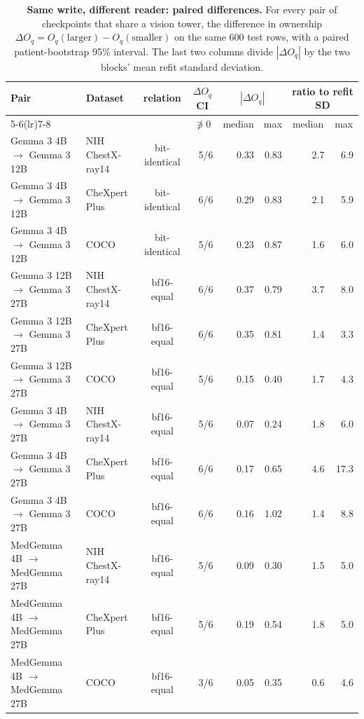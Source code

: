 \begin{table}[h]
\centering
\scriptsize
\setlength{\tabcolsep}{4pt}
\caption{\textbf{Same write, different reader: paired differences.} For every pair of checkpoints that share a vision tower, the difference in ownership $\Delta O_q=O_q(\text{larger})-O_q(\text{smaller})$ on the same 600 test rows, with a paired patient-bootstrap 95\% interval. The last two columns divide $|\Delta O_q|$ by the two blocks' mean refit standard deviation.}
\label{tab:cf-pairs}
\begin{tabular}{llcrrrrr}
\toprule
\multirow{2}{*}{Pair} & \multirow{2}{*}{Dataset} & \multirow{2}{*}{relation} & \multicolumn{1}{c}{$\Delta O_q$ CI} & \multicolumn{2}{c}{$|\Delta O_q|$} & \multicolumn{2}{c}{ratio to refit SD}\\
\cmidrule(lr){5-6}\cmidrule(lr){7-8}
&  &  & \multicolumn{1}{c}{$\not\ni 0$} & \multicolumn{1}{c}{median} & \multicolumn{1}{c}{max} & \multicolumn{1}{c}{median} & \multicolumn{1}{c}{max}\\
\midrule
Gemma 3 4B $\to$ Gemma 3 12B & NIH ChestX-ray14 & bit-identical & 5/6 & 0.33 & 0.83 & 2.7 & 6.9 \\
Gemma 3 4B $\to$ Gemma 3 12B & CheXpert Plus & bit-identical & 6/6 & 0.29 & 0.83 & 2.1 & 5.9 \\
Gemma 3 4B $\to$ Gemma 3 12B & COCO & bit-identical & 5/6 & 0.23 & 0.87 & 1.6 & 6.0 \\
Gemma 3 12B $\to$ Gemma 3 27B & NIH ChestX-ray14 & bf16-equal & 6/6 & 0.37 & 0.79 & 3.7 & 8.0 \\
Gemma 3 12B $\to$ Gemma 3 27B & CheXpert Plus & bf16-equal & 6/6 & 0.35 & 0.81 & 1.4 & 3.3 \\
Gemma 3 12B $\to$ Gemma 3 27B & COCO & bf16-equal & 5/6 & 0.15 & 0.40 & 1.7 & 4.3 \\
Gemma 3 4B $\to$ Gemma 3 27B & NIH ChestX-ray14 & bf16-equal & 5/6 & 0.07 & 0.24 & 1.8 & 6.0 \\
Gemma 3 4B $\to$ Gemma 3 27B & CheXpert Plus & bf16-equal & 6/6 & 0.17 & 0.65 & 4.6 & 17.3 \\
Gemma 3 4B $\to$ Gemma 3 27B & COCO & bf16-equal & 6/6 & 0.16 & 1.02 & 1.4 & 8.8 \\
MedGemma 4B $\to$ MedGemma 27B & NIH ChestX-ray14 & bf16-equal & 5/6 & 0.09 & 0.30 & 1.5 & 5.0 \\
MedGemma 4B $\to$ MedGemma 27B & CheXpert Plus & bf16-equal & 5/6 & 0.19 & 0.54 & 1.8 & 5.0 \\
MedGemma 4B $\to$ MedGemma 27B & COCO & bf16-equal & 3/6 & 0.05 & 0.35 & 0.6 & 4.6 \\
\bottomrule
\end{tabular}
\end{table}
